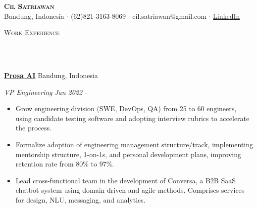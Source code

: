 \documentclass{article}
\newcommand{\lineunder} {
    \vspace*{-8pt} \\
    \hspace*{-10pt} \hrulefill \\
}
\newcommand{\header} [1] {
    \begin{center}
      {\large \scshape {#1}}
      \lineunder
    \end{center}
    \vspace*{-8pt}
}
\newcommand{\profile} [5] {
    \vspace*{-15pt}
    \begin{center}
        {\huge \scshape \textbf{#1}}\\
        \vspace{1mm}
        \small {#2} $\cdot$ {#3} $\cdot$ {#4} $\cdot$ {#5}
    \end{center}
    \vspace*{-8pt}
}
\begin{document}
\vspace*{-40pt}

\profile{Cil Satriawan}{Bandung, Indonesia}{(62)821-3163-8069}
{cil.satriawan@gmail.com}{\href{https://www.linkedin.com/in/cil-satriawan-a60601111}{LinkedIn}}

\header{Work Experience}
\vspace{1mm}

\href{https://prosa.ai}{\textbf{Prosa AI}} \hfill Bandung, Indonesia\\
\vspace{1mm}

\emph{VP Engineering} \hfill \emph{Jan 2022 -}\\
\vspace{-3mm}
\begin{itemize}[align=left, left=0pt..1em, itemsep=-2pt]
  \item Grow engineering division (SWE, DevOps, QA) from 25 to 60 engineers,
    using candidate testing software and adopting interview rubrics to
    accelerate the process.
  \item Formalize adoption of engineering management structure/track,
    implementing mentorship structure, 1-on-1s, and personal development plans,
    improving retention rate from 80\% to 97\%.
  \item Lead cross-functional team in the development of Conversa, a B2B SaaS
    chatbot system using domain-driven and agile methods. Comprises services
    for design, NLU, messaging, and analytics.
\end{itemize}
\vspace{-1mm}
\end{document}
